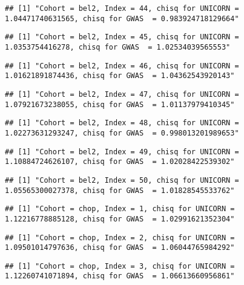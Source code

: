 \documentclass[]{article}
\begin{document}
\begin{verbatim}
## [1] "Cohort = bel2, Index = 44, chisq for UNICORN = 1.04471740631565, chisq for GWAS  = 0.983924718129664"
\end{verbatim}

\begin{verbatim}
## [1] "Cohort = bel2, Index = 45, chisq for UNICORN = 1.0353754416278, chisq for GWAS  = 1.02534039565553"
\end{verbatim}

\begin{verbatim}
## [1] "Cohort = bel2, Index = 46, chisq for UNICORN = 1.01621891874436, chisq for GWAS  = 1.04362543920143"
\end{verbatim}

\begin{verbatim}
## [1] "Cohort = bel2, Index = 47, chisq for UNICORN = 1.07921673238055, chisq for GWAS  = 1.01137979410345"
\end{verbatim}

\begin{verbatim}
## [1] "Cohort = bel2, Index = 48, chisq for UNICORN = 1.02273631293247, chisq for GWAS  = 0.998013201989653"
\end{verbatim}

\begin{verbatim}
## [1] "Cohort = bel2, Index = 49, chisq for UNICORN = 1.10884724626107, chisq for GWAS  = 1.02028422539302"
\end{verbatim}

\begin{verbatim}
## [1] "Cohort = bel2, Index = 50, chisq for UNICORN = 1.05565300027378, chisq for GWAS  = 1.01828545533762"
\end{verbatim}

\begin{verbatim}
## [1] "Cohort = chop, Index = 1, chisq for UNICORN = 1.12216778885128, chisq for GWAS  = 1.02991621352304"
\end{verbatim}

\begin{verbatim}
## [1] "Cohort = chop, Index = 2, chisq for UNICORN = 1.09501014797636, chisq for GWAS  = 1.06044765984292"
\end{verbatim}

\begin{verbatim}
## [1] "Cohort = chop, Index = 3, chisq for UNICORN = 1.12260741071894, chisq for GWAS  = 1.06613660956861"
\end{verbatim}
\end{document}
